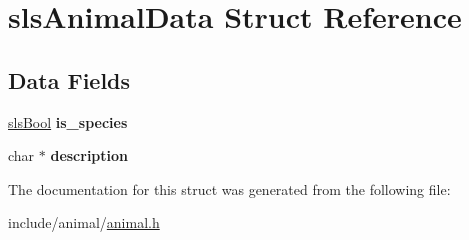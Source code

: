 \hypertarget{structsls_animal_data}{\section{sls\+Animal\+Data Struct Reference}
\label{structsls_animal_data}
}
\subsection*{Data Fields}
\begin{DoxyCompactItemize}
\item 
\hypertarget{structsls_animal_data_a286700a574da1c00589899d526467ab5}{\hyperlink{util_8h_a12d638c95aa5b7ad5241c1425471dad2}{sls\+Bool} {\bfseries is\+\_\+species}}\label{structsls_animal_data_a286700a574da1c00589899d526467ab5}

\item 
\hypertarget{structsls_animal_data_a6c6bf0e12b33664d13723fca35bf2f6b}{char $\ast$ {\bfseries description}}\label{structsls_animal_data_a6c6bf0e12b33664d13723fca35bf2f6b}

\end{DoxyCompactItemize}


The documentation for this struct was generated from the following file\+:\begin{DoxyCompactItemize}
\item 
include/animal/\hyperlink{animal_8h}{animal.\+h}\end{DoxyCompactItemize}
